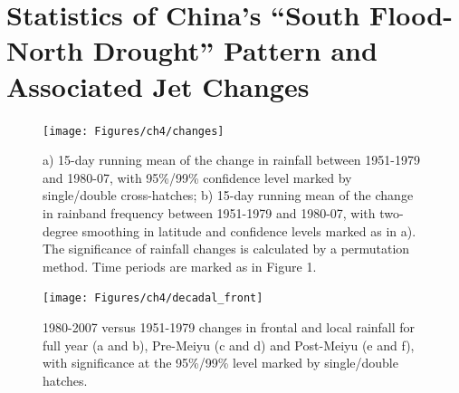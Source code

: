\chapter{Statistics of China's ``South Flood-North Drought'' Pattern and Associated Jet Changes}

\begin{figure}[htbp]
\noindent\texttt{[image: Figures/ch4/changes]}
\caption{a) 15-day running mean of the change in rainfall between 1951-1979 and 1980-07, with 95\%/99\% confidence level marked by single/double cross-hatches; b) 15-day running mean of the change in rainband frequency between 1951-1979 and 1980-07, with two-degree smoothing in latitude and confidence levels marked as in a). The significance of rainfall changes is calculated by a permutation method. Time periods are marked as in Figure 1.}
\label{fig:changes}
\end{figure}

\begin{figure}[htb]
\noindent\texttt{[image: Figures/ch4/decadal\_front]}
\caption{1980-2007 versus 1951-1979 changes in frontal and local rainfall for full year (a and b), Pre-Meiyu (c and d) and Post-Meiyu (e and f), with significance at the 95\%/99\% level marked by single/double hatches.}
\label{fig:decadal_front}
\end{figure}

